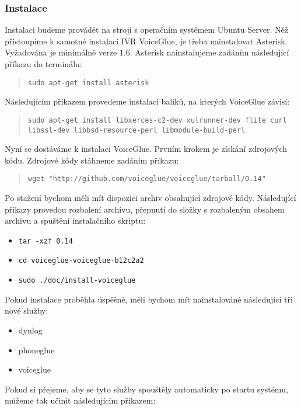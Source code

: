 \documentclass[ing,male,java,dept460]{diploma}						%
\begin{document}
\subsubsection{Instalace}
Instalaci budeme provádět na stroji s operačním systémem Ubuntu Server. Něž přistoupíme k samotné instalaci IVR VoiceGlue, je třeba nainstalovat Asterisk. Vyžadována je minimálně verze 1.6. Asterisk nainstalujeme zadáním následující příkazu do terminálu:

\begin{quote}
	\texttt{sudo apt-get install asterisk}
\end{quote}

Následujícím příkazem provedeme instalaci balíků, na kterých VoiceGlue závisí:

\begin{quote}
	\texttt{sudo apt-get install libxerces-c2-dev xulrunner-dev flite curl libssl-dev libbsd-resource-perl libmodule-build-perl}
\end{quote}

Nyní se dostáváme k instalaci VoiceGlue. Prvním krokem je získání zdrojových kódu. Zdrojové kódy stáhneme zadáním příkazu:

\begin{quote}
	\texttt{wget "http://github.com/voiceglue/voiceglue/tarball/0.14"}
\end{quote}

Po stažení bychom měli mít dispozici archiv obsahující zdrojové kódy. Následující příkazy provedou rozbalení archivu, přepnutí do složky s rozbaleným obsahem archivu a spuštění instalačního skriptu:

\begin{itemize}
\item \texttt{tar -xzf 0.14}
\item \texttt{cd voiceglue-voiceglue-b12c2a2}
\item \texttt{sudo ./doc/install-voiceglue}
\end{itemize}

Pokud instalace proběhla úspěšně, měli bychom mít nainstalováné následující tři nové služby:

\begin{itemize}
\item dynlog
\item phoneglue
\item voiceglue
\end{itemize}

Pokud si přejeme, aby se tyto služby spouštěly automaticky po startu systému, můžeme tak učinit následujícím příkazem:
\end{document}
